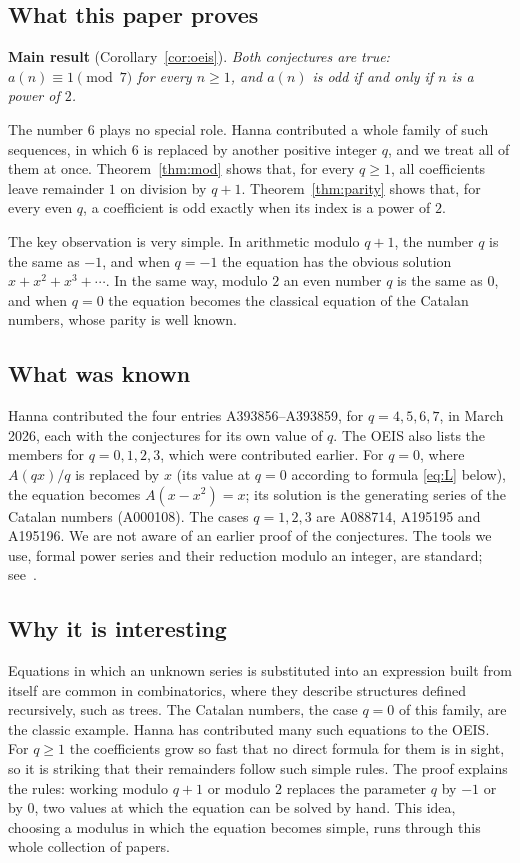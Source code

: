 \documentclass[11pt,a4paper]{article}
\theoremstyle{definition}
\theoremstyle{remark}
\begin{document}
\subsection{What this paper proves}
\textbf{Main result} (Corollary~\ref{cor:oeis}). \emph{Both conjectures are true: $a(n)\equiv1\pmod{7}$ for every $n\ge1$, and $a(n)$ is odd if and only if $n$ is a power of $2$.}

The number $6$ plays no special role. Hanna contributed a whole family of such sequences, in which
$6$ is replaced by another positive integer $q$, and we treat all of them at once.
Theorem~\ref{thm:mod} shows that, for every $q\ge1$, all coefficients leave remainder $1$ on division by $q+1$.
Theorem~\ref{thm:parity} shows that, for every even $q$, a coefficient is odd exactly when its index is a power of $2$.

The key observation is very simple. In arithmetic modulo $q+1$, the number $q$ is the same as $-1$, and when $q=-1$ the
equation has the obvious solution $x+x^2+x^3+\cdots$. In the same way, modulo $2$ an even number $q$ is the same as $0$,
and when $q=0$ the equation becomes the classical equation of the Catalan numbers, whose parity is well known.

\subsection{What was known}
Hanna contributed the four entries A393856--A393859, for $q=4,5,6,7$, in March 2026, each with the conjectures for its
own value of $q$. The OEIS also lists the members for $q=0,1,2,3$, which were contributed earlier. For $q=0$, where
$A(qx)/q$ is replaced by $x$ (its value at $q=0$ according to formula \eqref{eq:L} below), the equation becomes
$A(x-x^2)=x$; its solution is the generating series of the Catalan numbers (A000108). The cases $q=1,2,3$ are
A088714, A195195 and A195196. We are not aware of an earlier proof of the conjectures. The tools we use, formal power
series and their reduction modulo an integer, are standard; see~\cite{niven,stanley}.

\subsection{Why it is interesting}
Equations in which an unknown series is substituted into an expression built from itself are common in
combinatorics, where they describe structures defined recursively, such as trees. The Catalan numbers, the case $q=0$
of this family, are the classic example. Hanna has contributed many such equations to the OEIS. For $q\ge1$ the
coefficients grow so fast that no direct formula for them is in sight, so it is striking that their remainders follow
such simple rules. The proof explains the rules: working modulo $q+1$ or modulo $2$ replaces the parameter $q$ by $-1$
or by $0$, two values at which the equation can be solved by hand. This idea, choosing a modulus in which the equation
becomes simple, runs through this whole collection of papers.
\end{document}
